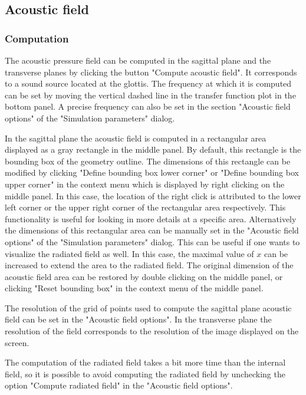 \documentclass[]{article}
\begin{document}
	\subsection{Acoustic field}
	
	\subsubsection{Computation}
	
	The acoustic pressure field can be computed in the sagittal plane and the 
	transverse planes by clicking the button "Compute acoustic field".
	It corresponds to a sound source located at the glottis.
	The frequency at which it is computed can be set by moving the vertical dashed line 
	in the transfer function plot in the bottom panel. 
	A precise frequency can also be set in the section "Acoustic field options" of the 
	"Simulation parameters" dialog.
	
	In the sagittal plane the acoustic field is computed in a rectangular area displayed
	as a gray rectangle in the middle panel. 
	By default, this rectangle is the bounding box of the geometry outline.
	The dimensions of this rectangle can be modified by clicking 
	"Define bounding box lower corner" or "Define bounding box upper corner" in the 
	context menu which is displayed by right clicking on the middle panel.
	In this case, the location of the right click is attributed to the lower left corner
	or the upper right corner of the rectangular area respectively.
	This functionality is useful for looking in more details at a specific area.
	Alternatively the dimensions of this rectangular area can be manually set in the
	"Acoustic field options" of the "Simulation parameters" dialog.
	This can be useful if one wants to visualize the radiated field as well.
	In this case, the maximal value of $x$ can be increased to extend the area to the 
	radiated field.
	The original dimension of the acoustic field area can be restored by double 
	clicking on the middle panel, or clicking "Reset bounding box" in the context
	menu of the middle panel.
	
	The resolution of the grid of points used to compute the sagittal plane 
	acoustic field can be set in the "Acoustic field options". 
	In the transverse plane the resolution of the field corresponds to the resolution 
	of the image displayed on the screen.
	
	The computation of the radiated field takes a bit more time than the internal field,
	so it is possible to avoid computing the radiated field by unchecking the 
	option "Compute radiated field" in the "Acoustic field options".
	
\end{document}
